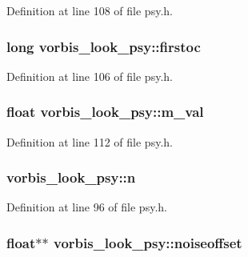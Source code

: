 Definition at line 108 of file psy.\+h.

\subsubsection[{\texorpdfstring{firstoc}{firstoc}}]{\setlength{\rightskip}{0pt plus 5cm}long vorbis\+\_\+look\+\_\+psy\+::firstoc}\hypertarget{structvorbis__look__psy_aa989a7d275eaa49f05d406a9760c9fcc}{}\label{structvorbis__look__psy_aa989a7d275eaa49f05d406a9760c9fcc}


Definition at line 106 of file psy.\+h.

\subsubsection[{\texorpdfstring{m\+\_\+val}{m_val}}]{\setlength{\rightskip}{0pt plus 5cm}float vorbis\+\_\+look\+\_\+psy\+::m\+\_\+val}\hypertarget{structvorbis__look__psy_aacbda1e90ed61475b1d1c6d81adc0cbb}{}\label{structvorbis__look__psy_aacbda1e90ed61475b1d1c6d81adc0cbb}


Definition at line 112 of file psy.\+h.

\subsubsection[{\texorpdfstring{n}{n}}]{ vorbis\+\_\+look\+\_\+psy\+::n}\hypertarget{structvorbis__look__psy_a32e7f5f9a3c335d9376c9b3ffb3dd929}{}\label{structvorbis__look__psy_a32e7f5f9a3c335d9376c9b3ffb3dd929}


Definition at line 96 of file psy.\+h.

\subsubsection[{\texorpdfstring{noiseoffset}{noiseoffset}}]{\setlength{\rightskip}{0pt plus 5cm}float$\ast$$\ast$ vorbis\+\_\+look\+\_\+psy\+::noiseoffset}\hypertarget{structvorbis__look__psy_a856b96ea21a9902f3564f0baa81de0d4}{}\label{structvorbis__look__psy_a856b96ea21a9902f3564f0baa81de0d4}


